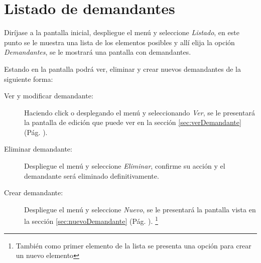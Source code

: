 \section{Listado de demandantes}
\label{sec:listadoDemandantes}
Dir\'ijase a la pantalla inicial, despliegue el men\'u \blackberry y seleccione
\emph{Listado}, en este punto se le muestra una lista de los elementos posibles
y all\'i elija la opci\'on \emph{Demandantes}, se le mostrar\'a una
pantalla con demandantes.

Estando en la pantalla podr\'a ver, eliminar y crear nuevos demandantes de la
siguiente forma:

\begin{description}
\item[Ver y modificar demandante:]Haciendo click o desplegando el men\'u
\blackberry y seleccionando \emph{Ver}, se le presentar\'a la pantalla de
edici\'on que puede ver en la secci\'on \ref{sec:verDemandante} (P\'ag.
\pageref{sec:verDemandante}).
\item[Eliminar demandante:]Despliegue el men\'u \blackberry y seleccione
\emph{Eliminar}, confirme su acci\'on y el demandante ser\'a eliminado
definitivamente.
\item[Crear demandante:]Despliegue el men\'u \blackberry y seleccione
\emph{Nuevo}, se le presentar\'a la pantalla vista en la
secci\'on \ref{sec:nuevoDemandante}
(P\'ag. \pageref{sec:nuevoDemandante}).
\footnote{Tambi\'en como primer elemento de la lista se presenta una opci\'on
para crear un nuevo elemento}
\end{description}
